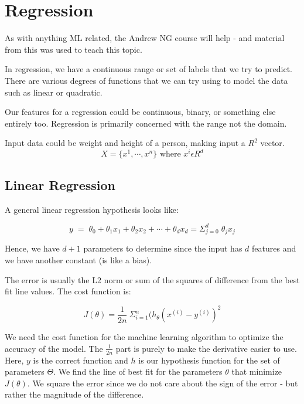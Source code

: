 \chapter{Regression}

As with anything ML related, the Andrew NG course will help - and material from this was used to teach this topic.

In regression, we have a continuous range or set of labels that we try to predict. There are various degrees of functions that we can try using to model the data such as linear or quadratic.

Our features for a regression could be continuous, binary, or something else entirely too. Regression is primarily concerned with the range not the domain.

Input data could be weight and height of a person, making input a $R^2$ vector. \[ X = \{x^1, \cdots, x^n\} \text{ where } x^i \epsilon R^d \]

\section{Linear Regression}

A general linear regression hypothesis looks like:

\begin{equation}
    y \; = \; \theta_0 + \theta_1x_1 + \theta_2x_2 + \cdots + \theta_dx_d = \Sigma_{j=0}^{d} \; \theta_jx_j
\end{equation}

Hence, we have $d+1$ parameters to determine since the input has $d$ features and we have another constant (is like a bias).

The error is usually the L2 norm or sum of the squares of difference from the best fit line values. The cost function is:

\begin{equation}
    J(\theta) = \frac{1}{2n} \: \Sigma_{i=1}^{n} (h_{\theta} (x^{(i)} - y^{(i)})^2
\end{equation}

We need the cost function for the machine learning algorithm to optimize the accuracy of the model. The $\frac{1}{2n}$ part is purely to make the derivative easier to use. Here, $y$ is the correct function and $h$ is our hypothesis function for the set of parameters $\Theta$. We find the line of best fit for the parameters $\theta$ that minimize $J(\theta)$. We square the error since we do not care about the sign of the error - but rather the magnitude of the difference. 

